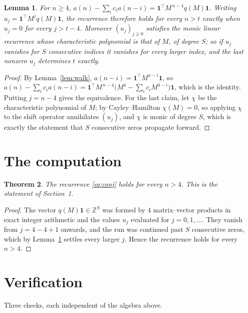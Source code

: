 \documentclass[11pt,a4paper]{article}
\theoremstyle{plain}
\newtheorem{theorem}{Theorem}
\newtheorem{lemma}[theorem]{Lemma}
\theoremstyle{definition}
\begin{document}
\begin{lemma}\label{lem:crit}
For $n\ge4$,
$a(n)-\sum_i c_i a(n-i)=\mathbf{1}^{\!\top}M^{\,n-4}q(M)\mathbf{1}$. Writing
$u_j=\mathbf{1}^{\!\top}M^{j}q(M)\mathbf{1}$, the recurrence therefore holds for every
$n>t$ exactly when $u_j=0$ for every $j>t-4$. Moreover $(u_j)_{j\ge0}$ satisfies the
monic linear recurrence whose characteristic polynomial is that of $M$, of degree $S$; so
if $u_j$ vanishes for $S$ consecutive indices it vanishes for every larger index, and the
last nonzero $u_j$ determines $t$ exactly.
\end{lemma}

\begin{proof}
By Lemma~\ref{lem:walk}, $a(n-i)=\mathbf{1}^{\!\top}M^{n-i}\mathbf{1}$, so
$a(n)-\sum_i c_i a(n-i)
=\mathbf{1}^{\!\top}M^{\,n-4}\bigl(M^{4}-\sum_i c_i M^{4-i}\bigr)
\mathbf{1}$, which is the identity. Putting $j=n-4$ gives the equivalence. For the
last claim, let $\chi$ be the characteristic polynomial of $M$; by Cayley--Hamilton
$\chi(M)=0$, so applying $\chi$ to the shift operator annihilates $(u_j)$, and $\chi$ is
monic of degree $S$, which is exactly the statement that $S$ consecutive zeros propagate
forward.
\end{proof}

\section{The computation}

\begin{theorem}
The recurrence \eqref{eq:conj} holds for every $n>4$. This is the statement of
Section~1.
\end{theorem}

\begin{proof}
The vector $q(M)\mathbf{1}\in\mathbb{Z}^{S}$ was formed by $4$ matrix--vector
products in exact integer arithmetic and the values $u_j$ evaluated for
$j=0,1,\dots$. They vanish from $j=4-4+1$ onwards, and the run was continued past
$S$ consecutive zeros, which by Lemma~\ref{lem:crit} settles every larger $j$. Hence the
recurrence holds for every $n>4$.
\end{proof}

\section{Verification}

Three checks, each independent of the algebra above.
\end{document}
